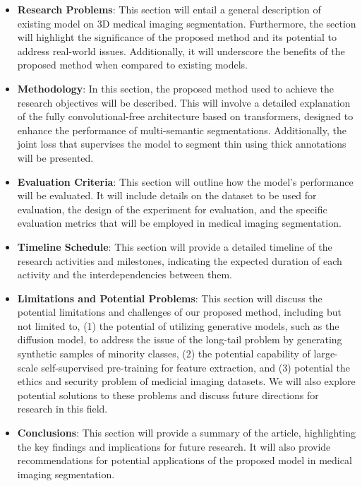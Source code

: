 \documentclass{article}
\begin{document}
\begin{itemize}
    \item \textbf{Research Problems}: This section will entail a general description of existing model on 3D medical imaging segmentation. Furthermore, the section will highlight the significance of the proposed method and its potential to address real-world issues. Additionally, it will underscore the benefits of the proposed method when compared to existing models.
    \item \textbf{Methodology}: In this section, the proposed method used to achieve the research objectives will be described. This will involve a detailed explanation of the fully convolutional-free architecture based on transformers, designed to enhance the performance of multi-semantic segmentations. Additionally, the joint loss that supervises the model to segment thin using thick annotations will be presented.
    \item \textbf{Evaluation Criteria}: This section will outline how the model's performance will be evaluated. It will include details on the dataset to be used for evaluation, the design of the experiment for evaluation, and the specific evaluation metrics that will be employed in medical imaging segmentation.
    \item \textbf{Timeline Schedule}: This section will provide a detailed timeline of the research activities and milestones, indicating the expected duration of each activity and the interdependencies between them.
    \item  \textbf{Limitations and Potential Problems}: This section will discuss the potential limitations and challenges of our proposed method, including but not limited to, (1) the potential of utilizing generative models, such as the diffusion model, to address the issue of the long-tail problem by generating synthetic samples of minority classes, (2) the potential capability of large-scale self-supervised pre-training for feature extraction, and (3) potential the ethics and security problem of medicial imaging datasets. We will also explore potential solutions to these problems and discuss future directions for research in this field.
    \item \textbf{Conclusions}: This section will provide a summary of the article, highlighting the key findings and implications for future research. It will also provide recommendations for potential applications of the proposed model in medical imaging segmentation.
\end{itemize}
\end{document}
